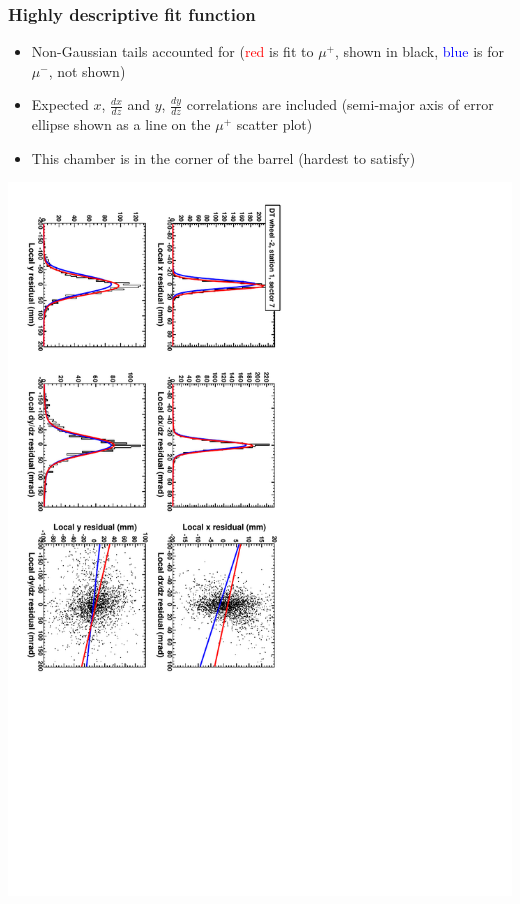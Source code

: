 \documentclass[compress]{beamer}
\begin{document}
\begin{frame}
\frametitle{Highly descriptive fit function}

\begin{itemize}
\item Non-Gaussian tails accounted for (\textcolor{red}{red} is fit to
  $\mu^+$, shown in black, \textcolor{blue}{blue} is for $\mu^-$, not
  shown)
\item Expected $x$, $\frac{dx}{dz}$ and $y$, $\frac{dy}{dz}$
  correlations are included (semi-major axis of error ellipse shown as
  a line on the $\mu^+$ scatter plot)
\item This chamber is in the corner of the barrel (hardest to satisfy)
\end{itemize}

\includegraphics[height=\linewidth, angle=90]{mcfit_extreme_corner2.pdf}
\end{frame}
\end{document}
